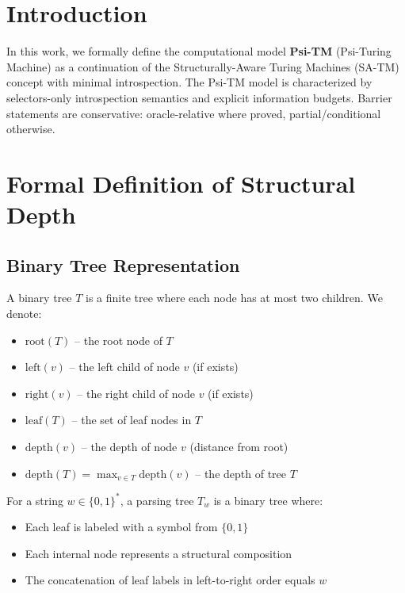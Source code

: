   
  
  \section{Introduction}\label{sec:introduction}
  
  In this work, we formally define the computational model \textbf{Psi-TM} (Psi-Turing Machine) as a continuation of the Structurally-Aware Turing Machines (SA-TM) \cite{Huseynzade2025} concept with minimal introspection. The Psi-TM model is characterized by selectors-only introspection semantics and explicit information budgets. Barrier statements are conservative: oracle-relative where proved, partial/conditional otherwise.
  
  \section{Formal Definition of Structural Depth}
  
  \subsection{Binary Tree Representation}
  
  \begin{definition}
  A binary tree $T$ is a finite tree where each node has at most two children. We denote:
  \begin{itemize}
  \item $\text{root}(T)$ -- the root node of $T$
  \item $\text{left}(v)$ -- the left child of node $v$ (if exists)
  \item $\text{right}(v)$ -- the right child of node $v$ (if exists)
  \item $\text{leaf}(T)$ -- the set of leaf nodes in $T$
  \item $\text{depth}(v)$ -- the depth of node $v$ (distance from root)
  \item $\text{depth}(T) = \max_{v \in T} \text{depth}(v)$ -- the depth of tree $T$
  \end{itemize}
  \end{definition}
  
  \begin{definition}
  For a string $w \in \{0,1\}^*$, a parsing tree $T_w$ is a binary tree where:
  \begin{itemize}
  \item Each leaf is labeled with a symbol from $\{0,1\}$
  \item Each internal node represents a structural composition
  \item The concatenation of leaf labels in left-to-right order equals $w$
  \end{itemize}
  \end{definition}
  
